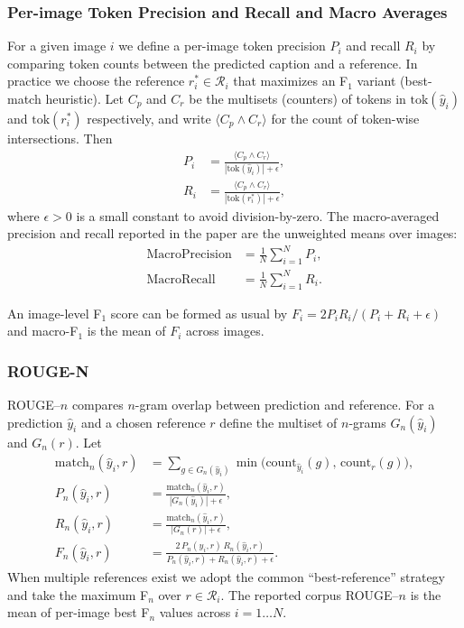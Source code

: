 \subsubsection{Per-image Token Precision and Recall and Macro Averages}
For a given image $i$ we define a per-image token precision $P_i$ and recall $R_i$ by comparing token counts between the predicted caption and a reference. In practice we choose the reference $r^*_i\in\mathcal{R}_i$ that maximizes an F$_1$ variant (best-match heuristic). Let $C_p$ and $C_r$ be the multisets (counters) of tokens in $\mathrm{tok}(\hat{y}_i)$ and $\mathrm{tok}(r^*_i)$ respectively, and write $\langle C_p \wedge C_r\rangle$ for the count of token-wise intersections. Then
\begin{align}
    P_i &= \frac{\langle C_p \wedge C_r\rangle}{|\mathrm{tok}(\hat{y}_i)| + \epsilon}, \\
    R_i &= \frac{\langle C_p \wedge C_r\rangle}{|\mathrm{tok}(r^*_i)| + \epsilon},
\end{align}
where $\epsilon>0$ is a small constant to avoid division-by-zero. The macro-averaged precision and recall reported in the paper are the unweighted means over images:
\begin{align}
    \mathrm{MacroPrecision} &= \frac{1}{N} \sum_{i=1}^{N} P_i, \\
    \mathrm{MacroRecall} &= \frac{1}{N} \sum_{i=1}^{N} R_i.
\end{align}

An image-level F$_1$ score can be formed as usual by $F_i = 2 P_i R_i / (P_i + R_i + \epsilon)$ and macro-F$_1$ is the mean of $F_i$ across images.

\subsubsection{ROUGE-N}
ROUGE--$n$ compares $n$-gram overlap between prediction and reference. For a prediction $\hat{y}_i$ and a chosen reference $r$ define the multiset of $n$-grams $G_n(\hat{y}_i)$ and $G_n(r)$. Let
\begin{align}
    \mathrm{match}_n(\hat{y}_i,r) &= \sum_{g \in G_n(\hat{y}_i)} \min\bigl(\mathrm{count}_{\hat{y}_i}(g),\,\mathrm{count}_{r}(g)\bigr), \\
    P_{n}(\hat{y}_i,r) &= \frac{\mathrm{match}_n(\hat{y}_i,r)}{|G_n(\hat{y}_i)| + \epsilon}, \\
    R_{n}(\hat{y}_i,r) &= \frac{\mathrm{match}_n(\hat{y}_i,r)}{|G_n(r)| + \epsilon}, \\
    F_{n}(\hat{y}_i,r) &= \frac{2\,P_{n}(\hat{y}_i,r)\,R_{n}(\hat{y}_i,r)}{P_{n}(\hat{y}_i,r)+R_{n}(\hat{y}_i,r)+\epsilon}.
\end{align}
When multiple references exist we adopt the common ``best-reference'' strategy and take the maximum F$_n$ over $r\in\mathcal{R}_i$. The reported corpus ROUGE--$n$ is the mean of per-image best F$_n$ values across $i=1\dots N$.

